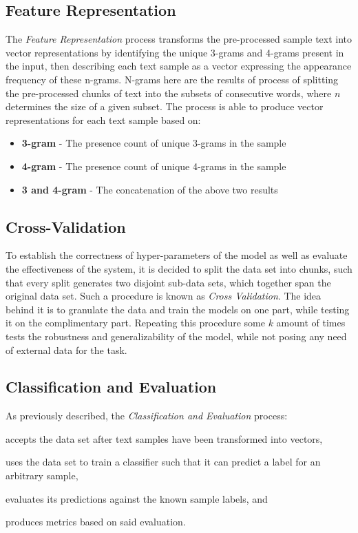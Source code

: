 \documentclass[conference]{sig-alternate-05-2015}
\begin{document}
\subsection{Feature Representation}\label{subsec:feature_rep}
The \textit{Feature Representation} process transforms the pre-processed sample
text into vector representations by identifying the unique 3-grams and 4-grams
present in the input, then describing each text sample as a vector expressing
the appearance frequency of these n-grams. N-grams here are the results of process
of splitting the pre-processed chunks of text into the subsets of consecutive
words, where $n$ determines the size of a given subset. The process is able to 
produce vector representations for each text sample based on:
\begin{itemize}
  \item \textbf{3-gram} - The presence count of unique 3-grams in the sample
  \item \textbf{4-gram} - The presence count of unique 4-grams in the sample
  \item \textbf{3 and 4-gram} - The concatenation of the above two results
\end{itemize}

\subsection{Cross-Validation}\label{subsec:cross_validation}
To establish the correctness of hyper-parameters of the model as well as 
evaluate the effectiveness of the system, it is decided to split the data set
into chunks, such that every split generates two disjoint sub-data sets,
which together span the original data set. Such a procedure is known as
\textit{Cross Validation}. The idea behind it is to granulate the data and 
train the models on one part, while testing it on the complimentary part.
Repeating this procedure some $k$ amount of times tests the robustness and 
generalizability of the model, while not posing any need of external data for 
the task.


\subsection{Classification and Evaluation}\label{subsec:classification}
As previously described, the \textit{Classification and Evaluation} process:
\begin{enumerate*}[(1)]
  \item accepts the data set after text samples have been transformed into
  vectors,
  \item uses the data set to train a classifier such that it can predict a label
  for an arbitrary sample,
  \item evaluates its predictions against the known sample labels, and
  \item produces metrics based on said evaluation.
\end{enumerate*}\par
\end{document}
